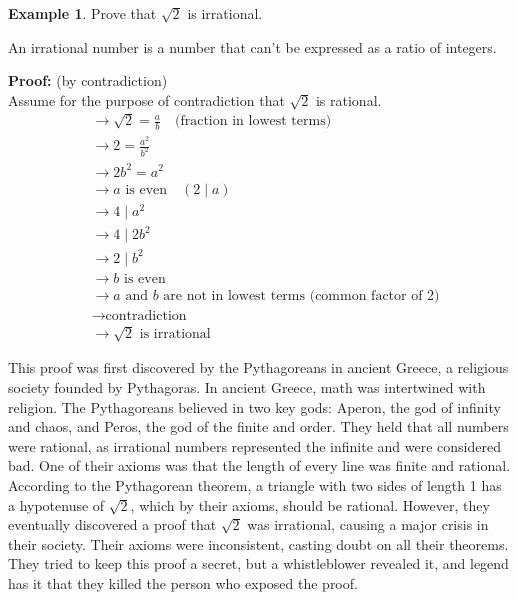 \documentclass[11pt]{article}
\theoremstyle{definition}
\newtheorem{example}{Example}
\begin{document}
\begin{example}
        Prove that \( \sqrt{2} \) is irrational.

        An irrational number is a number that can't be expressed as a ratio of integers.

        \textbf{Proof:} (by contradiction)\\
        Assume for the purpose of contradiction that \( \sqrt{2} \) is rational.
        \begin{align*}
                &\rightarrow \sqrt{2} = \frac{a}{b} \quad \text{(fraction in lowest terms)} \\
                &\rightarrow 2 = \frac{a^2}{b^2} \\
                &\rightarrow 2b^2 = a^2 \\
                &\rightarrow a \text{ is even} \quad (2 \mid a) \\
                &\rightarrow 4 \mid a^2 \\
                &\rightarrow 4 \mid 2b^2 \\
                &\rightarrow 2 \mid b^2 \\
                &\rightarrow b \text{ is even} \\
                &\rightarrow a \text{ and } b \text{ are not in lowest terms (common factor of 2)} \\
                &\rightarrow \text{contradiction} \\
                &\rightarrow \sqrt{2} \text{ is irrational}
        \end{align*}

        This proof was first discovered by the Pythagoreans in ancient Greece, a religious society founded by Pythagoras. In ancient Greece, math was intertwined with religion. The Pythagoreans believed in two key gods: Aperon, the god of infinity and chaos, and Peros, the god of the finite and order. They held that all numbers were rational, as irrational numbers represented the infinite and were considered bad. One of their axioms was that the length of every line was finite and rational. According to the Pythagorean theorem, a triangle with two sides of length 1 has a hypotenuse of \( \sqrt{2} \), which by their axioms, should be rational. However, they eventually discovered a proof that \( \sqrt{2} \) was irrational, causing a major crisis in their society. Their axioms were inconsistent, casting doubt on all their theorems. They tried to keep this proof a secret, but a whistleblower revealed it, and legend has it that they killed the person who exposed the proof.
\end{example}
\end{document}
